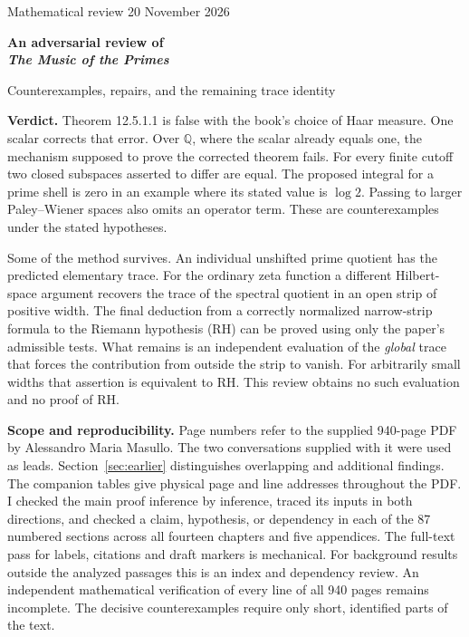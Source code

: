 \documentclass[11pt,letterpaper]{article}
\newcommand{\Q}{\mathbb Q}
\begin{document}
{\large Mathematical review \hfill 20 November 2026}\par
\vspace{1ex}
{\LARGE\bfseries An adversarial review of\\[2pt] \textit{The Music of the Primes}}\par
{\large Counterexamples, repairs, and the remaining trace identity}
\medskip

\textbf{Verdict.} Theorem 12.5.1.1 is false with the book's choice of Haar measure. One scalar corrects that error. Over $\Q$, where the scalar already equals one, the mechanism supposed to prove the corrected theorem fails. For every finite cutoff two closed subspaces asserted to differ are equal. The proposed integral for a prime shell is zero in an example where its stated value is $\log 2$. Passing to larger Paley--Wiener spaces also omits an operator term. These are counterexamples under the stated hypotheses.

Some of the method survives. An individual unshifted prime quotient has the predicted elementary trace. For the ordinary zeta function a different Hilbert-space argument recovers the trace of the spectral quotient in an open strip of positive width. The final deduction from a correctly normalized narrow-strip formula to the Riemann hypothesis (RH) can be proved using only the paper's admissible tests. What remains is an independent evaluation of the \emph{global} trace that forces the contribution from outside the strip to vanish. For arbitrarily small widths that assertion is equivalent to RH. This review obtains no such evaluation and no proof of RH.

\textbf{Scope and reproducibility.} Page numbers refer to the supplied 940-page PDF by Alessandro Maria Masullo. The two conversations supplied with it were used as leads. Section~\ref{sec:earlier} distinguishes overlapping and additional findings. The companion tables give physical page and line addresses throughout the PDF. I checked the main proof inference by inference, traced its inputs in both directions, and checked a claim, hypothesis, or dependency in each of the 87 numbered sections across all fourteen chapters and five appendices. The full-text pass for labels, citations and draft markers is mechanical. For background results outside the analyzed passages this is an index and dependency review. An independent mathematical verification of every line of all 940 pages remains incomplete. The decisive counterexamples require only short, identified parts of the text.
\end{document}
